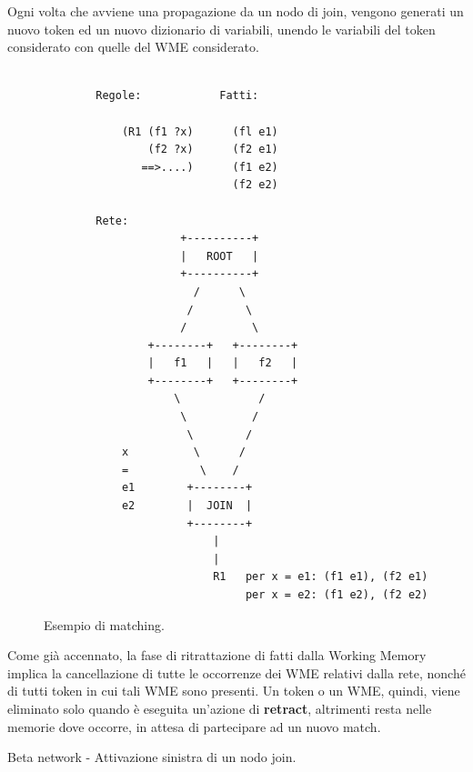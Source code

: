 Ogni volta che avviene una propagazione da un nodo di join, vengono generati un nuovo token ed un nuovo dizionario di variabili, unendo le variabili del token considerato con quelle del WME considerato.

\begin{figure}[!ht]
\centering
\begin{verbatim}

		Regole:            Fatti:
		
		    (R1 (f1 ?x)      (fl e1)
		        (f2 ?x)      (f2 e1)
		       ==>....)      (f1 e2)
		                     (f2 e2)
		                     
		Rete:
		             +----------+
		             |   ROOT   |
		             +----------+
		               /      \      		       
		              /        \        
		             /          \        
		        +--------+   +--------+	
		        |   f1   |   |   f2   |   
		        +--------+   +--------+
		            \            /		     
		             \          /
		              \        /
		    x          \      / 
		    =           \    /
		    e1        +--------+ 
		    e2        |  JOIN  |
		              +--------+
		                  | 
		                  |
		                  R1   per x = e1: (f1 e1), (f2 e1)
		                       per x = e2: (f1 e2), (f2 e2)

\end{verbatim}
\caption{Esempio di matching.}
\label{fig:beta1}
\end{figure}

Come già accennato, la fase di ritrattazione di fatti dalla Working Memory implica la cancellazione di tutte le occorrenze dei WME relativi dalla rete, nonché di tutti token in cui tali WME sono presenti. Un token o un WME, quindi, viene eliminato solo quando è eseguita un'azione di \textbf{retract}, altrimenti resta nelle memorie dove occorre, in attesa di partecipare ad un nuovo match.

\begin{algorithm}[h]
 
\caption{Beta network - Attivazione sinistra di un nodo join.}
\label{alg:leftactivation}
\end{algorithm}


